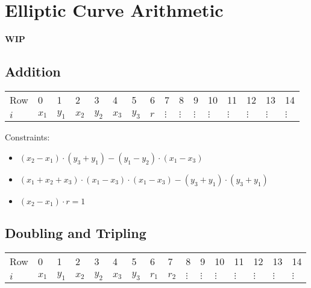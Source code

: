 \section{Elliptic Curve Arithmetic}
\label{section:ec}
\textbf{WIP}

\subsection{Addition}

\begin{center}
\begin{table}[H]
\begin{tabular}{llllllllllllllll}
 Row  & 0 & 1 & 2 & 3 & 4 & 5 & 6 & 7 & 8 & 9 & 10 & 11 & 12 & 13 & 14 \\
 $i$ 	  & $x_1$ & $y_1$ & $x_2$ & $y_2$ & $x_3$ & $y_3$ & $r$ & $\vdots$ & $\vdots$ & $\vdots$ & $\vdots$ & $\vdots$ & $\vdots$ & $\vdots$ & $\vdots$ \\
\end{tabular}
\end{table}
\end{center}

Constraints:
\begin{itemize}
	\item $(x_2 - x_1) \cdot (y_3 + y_1) - (y_1 - y_2) \cdot (x_1 - x_3)$
	\item $(x_1 + x_2 + x_3) \cdot (x_1 - x_3) \cdot (x_1 - x_3) - (y_3 + y_1) \cdot (y_3 + y_1)$
	\item $(x_2 - x_1) \cdot r = 1$
\end{itemize}

\subsection{Doubling and Tripling}

\begin{center}
\begin{table}[H]
\begin{tabular}{llllllllllllllll}
 Row  & 0 & 1 & 2 & 3 & 4 & 5 & 6 & 7 & 8 & 9 & 10 & 11 & 12 & 13 & 14 \\
 $i$ 	  & $x_1$ & $y_1$ & $x_2$ & $y_2$ & $x_3$ & $y_3$ & $r_1$ & $r_2$ & $\vdots$ & $\vdots$ & $\vdots$ & $\vdots$ & $\vdots$ & $\vdots$ & $\vdots$ \\
\end{tabular}
\end{table}
\end{center}

